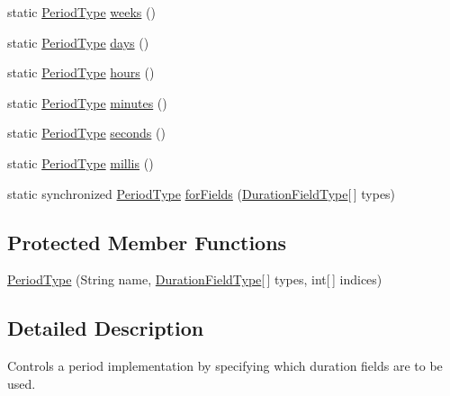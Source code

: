 \begin{DoxyCompactItemize}
\item 
static \hyperlink{classorg_1_1joda_1_1time_1_1_period_type}{Period\-Type} \hyperlink{classorg_1_1joda_1_1time_1_1_period_type_a5dd6c639de07a6cee4f1e461ac4b8776}{weeks} ()
\item 
static \hyperlink{classorg_1_1joda_1_1time_1_1_period_type}{Period\-Type} \hyperlink{classorg_1_1joda_1_1time_1_1_period_type_af479d223bc641065fb24cb76956631d4}{days} ()
\item 
static \hyperlink{classorg_1_1joda_1_1time_1_1_period_type}{Period\-Type} \hyperlink{classorg_1_1joda_1_1time_1_1_period_type_a8e2cfadadf03d63c82c55d393149e15a}{hours} ()
\item 
static \hyperlink{classorg_1_1joda_1_1time_1_1_period_type}{Period\-Type} \hyperlink{classorg_1_1joda_1_1time_1_1_period_type_aa46e585e34bd01334aa8c07f15d00b82}{minutes} ()
\item 
static \hyperlink{classorg_1_1joda_1_1time_1_1_period_type}{Period\-Type} \hyperlink{classorg_1_1joda_1_1time_1_1_period_type_a7e8b01ee6b8da64ee6b55c5dcbb8ab89}{seconds} ()
\item 
static \hyperlink{classorg_1_1joda_1_1time_1_1_period_type}{Period\-Type} \hyperlink{classorg_1_1joda_1_1time_1_1_period_type_a7bfb7cd740ae3fd14713abc143ee2c0b}{millis} ()
\item 
static synchronized \hyperlink{classorg_1_1joda_1_1time_1_1_period_type}{Period\-Type} \hyperlink{classorg_1_1joda_1_1time_1_1_period_type_af0c2d8dea49b9738deafe53c29da19cd}{for\-Fields} (\hyperlink{classorg_1_1joda_1_1time_1_1_duration_field_type}{Duration\-Field\-Type}\mbox{[}$\,$\mbox{]} types)
\end{DoxyCompactItemize}
\subsection*{Protected Member Functions}
\begin{DoxyCompactItemize}
\item 
\hyperlink{classorg_1_1joda_1_1time_1_1_period_type_ac7a55e704e2d7f28b0b1dfae19a27150}{Period\-Type} (String name, \hyperlink{classorg_1_1joda_1_1time_1_1_duration_field_type}{Duration\-Field\-Type}\mbox{[}$\,$\mbox{]} types, int\mbox{[}$\,$\mbox{]} indices)
\end{DoxyCompactItemize}


\subsection{Detailed Description}
Controls a period implementation by specifying which duration fields are to be used. 

